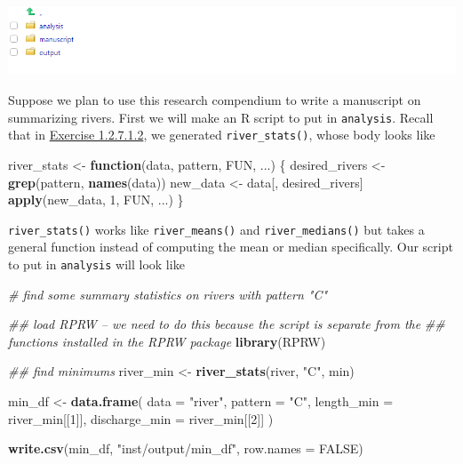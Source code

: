 \documentclass[
]{book}
\newenvironment{Shaded}{\begin{snugshade}}{\end{snugshade}}
\newcommand{\CommentTok}[1]{\textcolor[rgb]{0.56,0.35,0.01}{\textit{#1}}}
\newcommand{\ControlFlowTok}[1]{\textcolor[rgb]{0.13,0.29,0.53}{\textbf{#1}}}
\newcommand{\DataTypeTok}[1]{\textcolor[rgb]{0.13,0.29,0.53}{#1}}
\newcommand{\DecValTok}[1]{\textcolor[rgb]{0.00,0.00,0.81}{#1}}
\newcommand{\KeywordTok}[1]{\textcolor[rgb]{0.13,0.29,0.53}{\textbf{#1}}}
\newcommand{\NormalTok}[1]{#1}
\newcommand{\OtherTok}[1]{\textcolor[rgb]{0.56,0.35,0.01}{#1}}
\newcommand{\StringTok}[1]{\textcolor[rgb]{0.31,0.60,0.02}{#1}}
\begin{document}
\includegraphics[width=1\linewidth]{images/newrpack_files10}

Suppose we plan to use this research compendium to write a manuscript on summarizing rivers. First we will make an R script to put in \texttt{analysis}. Recall that in \protect\hyperlink{ex-set3}{Exercise 1.2.7.1.2}, we generated \texttt{river\_stats()}, whose body looks like

\begin{Shaded}
\begin{Highlighting}[]
\NormalTok{river_stats <-}\StringTok{ }\ControlFlowTok{function}\NormalTok{(data, pattern, FUN, ...) \{}
\NormalTok{  desired_rivers <-}\StringTok{ }\KeywordTok{grep}\NormalTok{(pattern, }\KeywordTok{names}\NormalTok{(data))}
\NormalTok{  new_data <-}\StringTok{ }\NormalTok{data[, desired_rivers]}
  \KeywordTok{apply}\NormalTok{(new_data, }\DecValTok{1}\NormalTok{, FUN, ...)}
\NormalTok{\}}
\end{Highlighting}
\end{Shaded}

\texttt{river\_stats()} works like \texttt{river\_means()} and \texttt{river\_medians()} but takes a general function instead of computing the mean or median specifically. Our script to put in \texttt{analysis} will look like

\begin{Shaded}
\begin{Highlighting}[]
\CommentTok{# find some summary statistics on rivers with pattern "C"}

\CommentTok{## load RPRW -- we need to do this because the script is separate from the }
\CommentTok{## functions installed in the RPRW package}
\KeywordTok{library}\NormalTok{(RPRW) }

\CommentTok{## find minimums}
\NormalTok{river_min <-}\StringTok{ }\KeywordTok{river_stats}\NormalTok{(river, }\StringTok{"C"}\NormalTok{, min)}

\NormalTok{min_df <-}\StringTok{ }\KeywordTok{data.frame}\NormalTok{(}
  \DataTypeTok{data =} \StringTok{"river"}\NormalTok{,}
  \DataTypeTok{pattern =} \StringTok{"C"}\NormalTok{,}
  \DataTypeTok{length_min =}\NormalTok{ river_min[[}\DecValTok{1}\NormalTok{]],}
  \DataTypeTok{discharge_min =}\NormalTok{ river_min[[}\DecValTok{2}\NormalTok{]]}
\NormalTok{)}

\KeywordTok{write.csv}\NormalTok{(min_df, }\StringTok{"inst/output/min_df"}\NormalTok{, }\DataTypeTok{row.names =} \OtherTok{FALSE}\NormalTok{)}
\end{Highlighting}
\end{Shaded}
\end{document}
